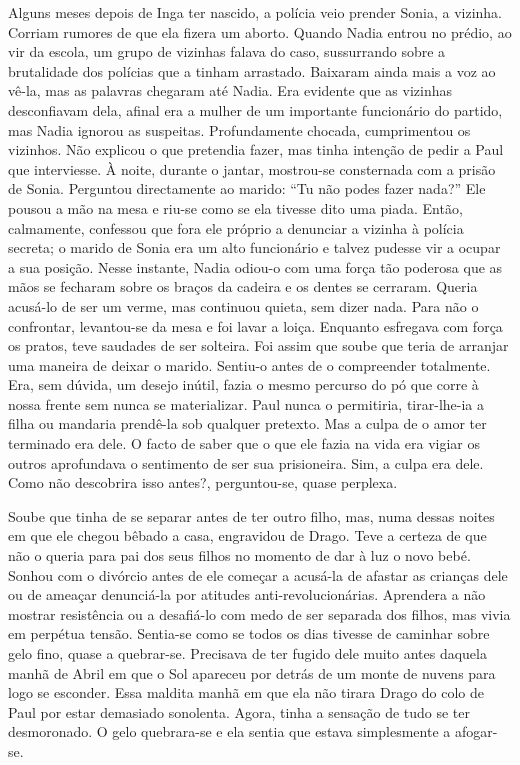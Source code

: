 Alguns meses depois de Inga ter nascido, a polícia veio prender Sonia, a
vizinha. Corriam rumores de que ela fizera um aborto. Quando Nadia
entrou no prédio, ao vir da escola, um grupo de vizinhas falava do caso,
sussurrando sobre a brutalidade dos polícias que a tinham arrastado.
Baixaram ainda mais a voz ao vê-la, mas as palavras chegaram até
Nadia. Era evidente que as vizinhas desconfiavam dela, afinal era a
mulher de um importante funcionário do partido, mas Nadia ignorou as
suspeitas. Profundamente chocada, cumprimentou os vizinhos. Não
explicou o que pretendia fazer, mas tinha intenção de pedir a Paul que
interviesse. À noite, durante o jantar, mostrou-se consternada com a
prisão de Sonia. Perguntou directamente ao marido: ``Tu não podes fazer
nada?'' Ele pousou a mão na mesa e riu-se como se ela tivesse dito uma
piada. Então, calmamente, confessou que fora ele próprio a denunciar a
vizinha à polícia secreta; o marido de Sonia era um alto funcionário e
talvez pudesse vir a ocupar a sua posição. Nesse instante, Nadia odiou-o
com uma força tão poderosa que as mãos se fecharam sobre os braços da
cadeira e os dentes se cerraram. Queria acusá-lo de ser um verme, mas
continuou quieta, sem dizer nada. Para não o confrontar, levantou-se da
mesa e foi lavar a loiça. Enquanto esfregava com força os pratos, teve
saudades de ser solteira. Foi assim que soube que teria de arranjar uma
maneira de deixar o marido. Sentiu-o antes de o compreender totalmente.
Era, sem dúvida, um desejo inútil, fazia o mesmo percurso do pó que
corre à nossa frente sem nunca se materializar. Paul nunca o permitiria,
tirar-lhe-ia a filha ou mandaria prendê-la sob qualquer pretexto. Mas a culpa de o amor ter terminado era
dele. O facto de saber que o que ele fazia na vida era vigiar os outros
aprofundava o sentimento de ser sua prisioneira. Sim, a culpa era dele.
Como não descobrira isso antes?, perguntou-se, quase perplexa.

Soube que tinha de se separar antes de ter outro filho, mas, numa dessas
noites em que ele chegou bêbado a casa, engravidou de Drago. Teve a
certeza de que não o queria para pai dos seus filhos no momento de dar à
luz o novo bebé. Sonhou com o divórcio antes de ele começar a acusá-la de afastar as crianças dele ou de ameaçar denunciá-la por atitudes
anti-revolucionárias. Aprendera a não mostrar resistência ou a
desafiá-lo com medo de ser separada dos filhos, mas vivia em perpétua
tensão. Sentia-se como se todos os dias tivesse de caminhar sobre gelo
fino, quase a quebrar-se. Precisava de ter fugido dele muito antes
daquela manhã de Abril em que o Sol apareceu por detrás de um monte de
nuvens para logo se esconder. Essa maldita manhã em que ela não tirara
Drago do colo de Paul por estar demasiado sonolenta. Agora, tinha a
sensação de tudo se ter desmoronado. O gelo quebrara-se e ela sentia que
estava simplesmente a afogar-se.


